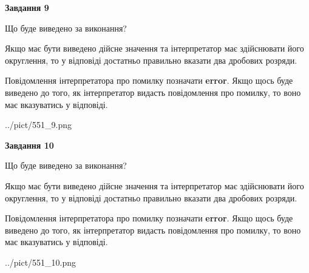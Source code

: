 \documentclass[12pt, ukrainian]{article}
\begin{document}
{\begin {Large}
{\begin {center}\textbf{Завдання 9}\end {center}}\par
Що буде виведено за виконання? \par

Якщо має бути виведено дійсне значення та інтерпретатор має здійснювати його округлення, 
то у відповіді достатньо правильно вказати два дробових розряди.

Повідомлення інтерпретатора про помилку позначати \textbf{error}.
Якщо щось буде виведено до того, як інтерпретатор видасть повідомлення про помилку, 
то воно має вказуватись у відповіді. \par

\begin{center}
	{../pict/551_9.png}
\end{center}
\newpage

{\begin {center}\textbf{Завдання 10}\end {center}}\par
Що буде виведено за виконання? \par

Якщо має бути виведено дійсне значення та інтерпретатор має здійснювати його округлення, 
то у відповіді достатньо правильно вказати два дробових розряди.

Повідомлення інтерпретатора про помилку позначати \textbf{error}.
Якщо щось буде виведено до того, як інтерпретатор видасть повідомлення про помилку, 
то воно має вказуватись у відповіді. \par

\begin{center}
	{../pict/551_10.png}
\end{center}
\newpage

\end {Large}}
\end{document}

